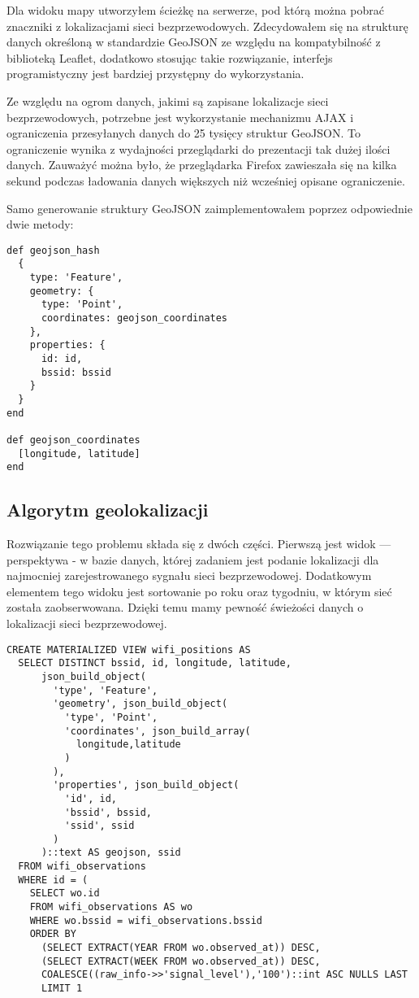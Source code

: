 Dla widoku mapy utworzyłem ścieżkę na serwerze, pod którą można pobrać znaczniki z lokalizacjami sieci bezprzewodowych. Zdecydowałem się na strukturę danych określoną w standardzie GeoJSON ze względu na kompatybilność z biblioteką Leaflet, dodatkowo stosując takie rozwiązanie, interfejs programistyczny jest bardziej przystępny do wykorzystania.

Ze względu na ogrom danych, jakimi są zapisane lokalizacje sieci bezprzewodowych, potrzebne jest wykorzystanie mechanizmu AJAX i ograniczenia przesyłanych danych do 25 tysięcy struktur GeoJSON. To ograniczenie wynika z wydajności przeglądarki do prezentacji tak dużej ilości danych. Zauważyć można było, że przeglądarka Firefox zawieszała się na kilka sekund podczas ładowania danych większych niż wcześniej opisane ograniczenie.

Samo generowanie struktury GeoJSON zaimplementowałem poprzez odpowiednie dwie metody:

\begin{verbatim}
def geojson_hash
  {
    type: 'Feature',
    geometry: {
      type: 'Point',
      coordinates: geojson_coordinates
    },
    properties: {
      id: id,
      bssid: bssid
    }
  }
end

def geojson_coordinates
  [longitude, latitude]
end
\end{verbatim}

\subsection{Algorytm geolokalizacji}

Rozwiązanie tego problemu składa się z dwóch części. Pierwszą jest widok — perspektywa - w bazie danych, której zadaniem jest podanie lokalizacji dla najmocniej zarejestrowanego sygnału sieci bezprzewodowej. Dodatkowym elementem tego widoku jest sortowanie po roku oraz tygodniu, w którym sieć została zaobserwowana. Dzięki temu mamy pewność świeżości danych o lokalizacji sieci bezprzewodowej.

\begin{verbatim}
CREATE MATERIALIZED VIEW wifi_positions AS
  SELECT DISTINCT bssid, id, longitude, latitude,
      json_build_object(
        'type', 'Feature',
        'geometry', json_build_object(
          'type', 'Point',
          'coordinates', json_build_array(
            longitude,latitude
          )
        ),
        'properties', json_build_object(
          'id', id,
          'bssid', bssid,
          'ssid', ssid
        )
      )::text AS geojson, ssid
  FROM wifi_observations
  WHERE id = (
    SELECT wo.id
    FROM wifi_observations AS wo
    WHERE wo.bssid = wifi_observations.bssid
    ORDER BY
      (SELECT EXTRACT(YEAR FROM wo.observed_at)) DESC,
      (SELECT EXTRACT(WEEK FROM wo.observed_at)) DESC,
      COALESCE((raw_info->>'signal_level'),'100')::int ASC NULLS LAST
      LIMIT 1
\end{verbatim}

